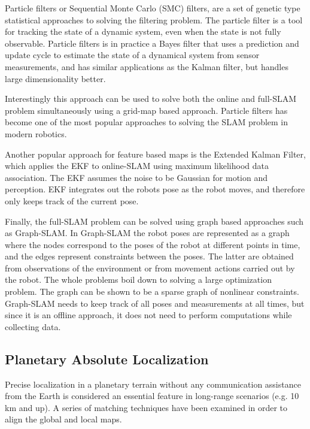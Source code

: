 Particle filters or Sequential Monte Carlo (SMC) filters, are a set of
genetic type statistical approaches to solving the filtering problem.
The particle filter is a tool for tracking the state of a dynamic system,
even when the state is not fully observable.
Particle filters is in practice a Bayes filter that uses a prediction
and update cycle to estimate the state of a dynamical system from
sensor measurements, and has similar applications as the Kalman filter,
but handles large dimensionality better.

Interestingly this approach can be used to solve both the online and
full-SLAM problem simultaneously using a grid-map based approach.
Particle filters has become one of the most popular approaches to
solving the SLAM problem in modern robotics.

Another popular approach for feature based maps is the Extended Kalman Filter,
which applies the EKF to online-SLAM using maximum likelihood data association.
The EKF assumes the noise to be Gaussian for motion and perception.
EKF integrates out the robots pose as the robot moves, and therefore only
keeps track of the current pose.

Finally, the full-SLAM problem can be solved using graph based approaches
such as Graph-SLAM.
In Graph-SLAM the robot poses are represented as a graph where the
nodes correspond to the poses of the robot at different points in time,
and the edges represent constraints between the poses.
The latter are obtained from observations of the environment or from
movement actions carried out by the robot.
The whole problems boil down to solving a large optimization problem.
The graph can be shown to be a sparse graph of nonlinear constraints.
Graph-SLAM needs to keep track of all poses and measurements at all times,
but since it is an offline approach, it does not need to perform computations
while collecting data.

\subsection{Planetary Absolute Localization}

Precise localization in a planetary terrain without any communication
assistance from the Earth is considered an essential feature in
long-range scenarios (e.g. 10 km and up).
A series of matching techniques have been examined in order to align the
global and local maps.


